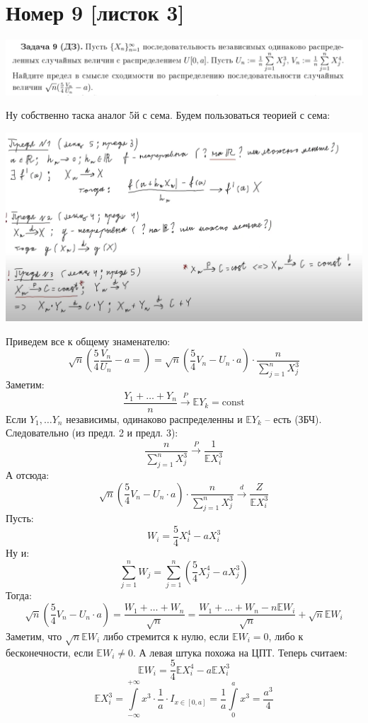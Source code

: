 \documentclass[a4paper,12pt]{article}
\begin{document}
\section*{Номер 9 [листок 3]}
\begin{center}
\includegraphics[scale=0.4]{4.png}
\end{center}
Ну собственно таска аналог 5й с сема. Будем пользоваться теорией с сема:
\begin{center}
\includegraphics[scale=0.2]{5.png}
\end{center}
Приведем все к общему знаменателю:
\[
\sqrt{n} \left(
\frac{5}{4} \frac{V_n}{U_n} - a = 
\right)
=
\sqrt{n} 
\left(
\frac{5}{4}V_n - U_n \cdot a 
\right)
\cdot
\frac{n}{\sum\limits_{j=1}^{n} X_j^3}
\]
Заметим:
\[
\frac{Y_1 + \ldots + Y_n}{n}
\overset{P}{\longrightarrow} \mathbb{E}Y_k = \text{const}
\]
Если $Y_1, \ldots Y_n$ независимы, одинаково распределенны и $\mathbb{E}Y_k$ -- есть (ЗБЧ). Следовательно (из предл. 2 и предл. 3):
\[
\frac{n}{\sum\limits_{j = 1}^n X_j^3}\overset{P}{\longrightarrow} \frac{1}{\mathbb{E} X_i^3}
\]
А отсюда:
\[
\sqrt{n} 
\left(
\frac{5}{4}V_n - U_n \cdot a 
\right)
\cdot
\frac{n}{\sum\limits_{j=1}^{n} X_j^3} 
\overset{d}{\longrightarrow} \frac{Z}{\mathbb{E} X_i^3}
\]
Пусть:
\[
W_i = \frac{5}{4} X_i^4 - a X_i^3
\]
Ну и:
\[
\sum_{j = 1}^{n} W_j = \sum_{j = 1}^n \left(\frac{5}{4} X_j^4 - a X_j^3 \right)
\]
Тогда:
\[
\sqrt{n} 
\left(
\frac{5}{4}V_n - U_n \cdot a 
\right)
=
\frac{W_1 + \ldots + W_n}{\sqrt{n}}
=
\frac{W_1 + \ldots + W_n - n \mathbb{E} W_i}{\sqrt{n}} + \sqrt{n} \mathbb{E} W_i
\]
Заметим, что $\sqrt{n} \mathbb{E} W_i$ либо стремится к нулю, если $\mathbb{E} W_i = 0$, либо к бесконечности, если $\mathbb{E} W_i \neq 0$. А левая штука похожа на ЦПТ. Теперь считаем:
\[
\mathbb{E} W_i = \frac{5}{4} \mathbb{E}X_i^4 - a \mathbb{E}X_i^3
\]
\[
\mathbb{E}X_i^3 = \int\limits_{-\infty}^{+\infty} x^3 \cdot \frac{1}{a} \cdot I_{x \in [0, a]} = \frac{1}{a} \int\limits_0^a x^3 = \frac{a^3}{4}
\]
\end{document}
